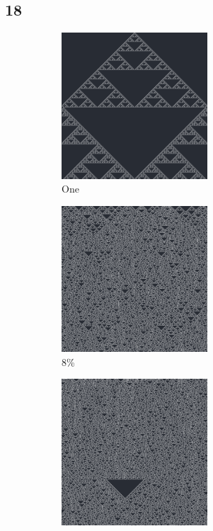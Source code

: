 \documentclass[12pt, fleqn]{report}                             %
\theoremstyle{break}                                            %
\begin{document}
      \subsection{18}
      \begin{figure}[ht!]
        \centering
        \begin{subfigure}[b]{0.4\linewidth}
          \includegraphics[width=0.6\textwidth]{Images/18/a.png}
          \caption{One}
        \end{subfigure}
        \begin{subfigure}[b]{0.4\linewidth}
          \includegraphics[width=0.6\textwidth]{Images/18/b.png}
          \caption{8\%}
        \end{subfigure}
        \begin{subfigure}[b]{0.4\linewidth}
          \includegraphics[width=0.6\textwidth]{Images/18/c.png}

\end{subfigure}
\end{figure}
\end{document}
